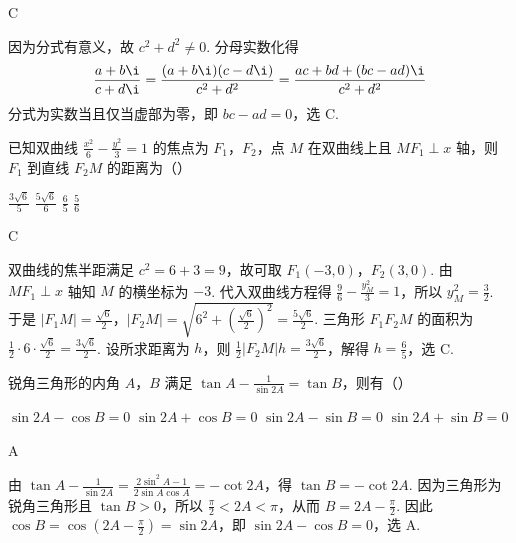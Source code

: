 \begin{answer}
C
\end{answer}

\begin{solution}
因为分式有意义，故 \(c^2+d^2\neq0\). 分母实数化得
\[
\frac{a+b\i}{c+d\i}=\frac{(a+b\i)(c-d\i)}{c^2+d^2}=\frac{ac+bd+(bc-ad)\i}{c^2+d^2}
\]
分式为实数当且仅当虚部为零，即 \(bc-ad=0\)，选 C.
\end{solution}

\begin{problem}
已知双曲线 \(\frac{x^2}{6} - \frac{y^2}{3} = 1\) 的焦点为 \(F_1\)，\(F_2\)，点 \(M\) 在双曲线上且 \(MF_1 \perp x\) 轴，则 \(F_1\) 到直线 \(F_2M\) 的距离为（\quad）

\choices
    {\(\frac{3\sqrt{6}}{5}\)}
    {\(\frac{5\sqrt{6}}{6}\)}
    {\(\frac{6}{5}\)}
    {\(\frac{5}{6}\)}
\end{problem}

\begin{answer}
C
\end{answer}

\begin{solution}
双曲线的焦半距满足 \(c^2=6+3=9\)，故可取 \(F_1(-3,0)\)，\(F_2(3,0)\). 由 \(MF_1\perp x\) 轴知 \(M\) 的横坐标为 \(-3\). 代入双曲线方程得 \(\frac{9}{6}-\frac{y_M^2}{3}=1\)，所以 \(y_M^2=\frac{3}{2}\).
于是 \(\lvert F_1M\rvert=\frac{\sqrt{6}}{2}\)，\(\lvert F_2M\rvert=\sqrt{6^2+\left(\frac{\sqrt{6}}{2}\right)^2}=\frac{5\sqrt{6}}{2}\). 三角形 \(F_1F_2M\) 的面积为 \(\frac{1}{2}\cdot6\cdot\frac{\sqrt{6}}{2}=\frac{3\sqrt{6}}{2}\). 设所求距离为 \(h\)，则 \(\frac{1}{2}\lvert F_2M\rvert h=\frac{3\sqrt{6}}{2}\)，解得 \(h=\frac{6}{5}\)，选 C.
\end{solution}

\begin{problem}
锐角三角形的内角 \(A\)，\(B\) 满足 \(\tan A - \frac{1}{\sin 2A} = \tan B\)，则有（\quad）

\choices
    {\(\sin 2A - \cos B = 0\)}
    {\(\sin 2A + \cos B = 0\)}
    {\(\sin 2A - \sin B = 0\)}
    {\(\sin 2A + \sin B = 0\)}
\end{problem}

\begin{answer}
A
\end{answer}

\begin{solution}
由 \(\tan A-\frac{1}{\sin2A}=\frac{2\sin^2A-1}{2\sin A\cos A}=-\cot2A\)，得 \(\tan B=-\cot2A\). 因为三角形为锐角三角形且 \(\tan B>0\)，所以 \(\frac{\pi}{2}<2A<\pi\)，从而 \(B=2A-\frac{\pi}{2}\). 因此 \(\cos B=\cos\left(2A-\frac{\pi}{2}\right)=\sin2A\)，即 \(\sin2A-\cos B=0\)，选 A.
\end{solution}

